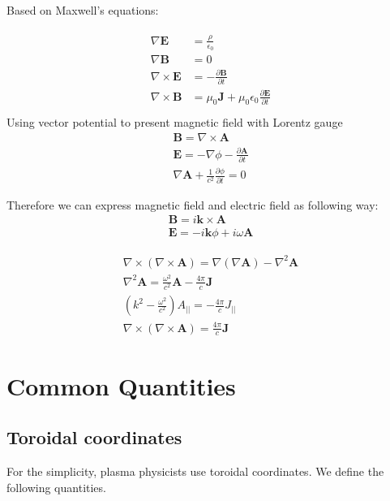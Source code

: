 Based on Maxwell's equations:

\begin{eqnarray}
\begin{aligned}
    \nabla \textbf{E}{}&=\frac{\rho}{\epsilon_0}\\
    \nabla \textbf{B} &= 0\\
    \nabla \times \textbf{E} &= -\frac{\partial \textbf{B}}{\partial t}\\
     \nabla \times \textbf{B} &= \mu_0\textbf{J}+\mu_0\epsilon_0 \frac{\partial \textbf{E}}{\partial t}\\
\end{aligned}
     \label{eq:Maxwell}
\end{eqnarray}
Using vector potential to present magnetic field with Lorentz gauge
\begin{eqnarray}
     \textbf{B}= \nabla \times \textbf{A}\\
     \textbf{E}=-\nabla \phi -\frac{\partial \textbf{A}}{\partial t}\\
     \nabla \textbf{A}+ \frac{1}{c^2}\frac{\partial \phi}{\partial t}=0
\end{eqnarray}

Therefore we can express magnetic field and electric field as following way:
\begin{eqnarray}
     \textbf{B}= i\textbf{k}\times \textbf{A}\\
     \textbf{E} = -i\textbf{k} \phi +i\omega \textbf{A}
     \label{eq:E-A}
\end{eqnarray}

\begin{eqnarray}
     \nabla \times (\nabla \times \textbf{A})=\nabla (\nabla \textbf{A}) -\nabla^2 \textbf{A}\\
     \nabla^2 \textbf{A}=\frac{\omega^2}{c^2} \textbf{A}-\frac{4\pi}{c} \textbf{J}\\
     (k^2-\frac{\omega^2}{c^2})A_{||}=-\frac{4\pi}{c}J_{||}\\
    \nabla \times (\nabla \times \textbf{A})=\frac{4\pi}{c} \textbf{J}
\end{eqnarray}

\section{Common Quantities}

\subsection{Toroidal coordinates}
For the simplicity, plasma physicists use toroidal coordinates. We define the following quantities.

